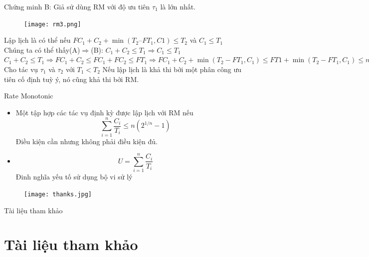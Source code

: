 \documentclass{beamer}
\begin{document}
\begin{frame}{Chứng minh}
B: Giả sử dùng RM với độ ưu tiên $\tau_1$ là lớn nhất.
\begin{figure}[h]
\begin{center}
\texttt{[image: rm3.png]}
\end{center}
\end{figure}
Lập lịch là có thể nếu $FC_1 + C_2 + \min(T_2 – FT_1, C1) \leq T_2$ và $C_1 \leq T_1$ \\
Chúng ta có thể thấy(A)$\Rightarrow$(B): $C_1 + C_2 \leq T_1 \Rightarrow C_1 \leq T_1$ \\
$
C_1 + C_2 \leq T_1 \Rightarrow FC_1 + C_2 \leq FC_1 + FC_2 \leq FT_1 \Rightarrow 
FC_1 + C_2 + \min(T_2 - FT_1, C_1) \leq FT1 + \min(T_2 - FT_1, C_1) \leq min(T_2, C_1 + FT_1) \leq T_2
$ \\
Cho tác vụ $\tau_1$ và $\tau_2$ với $T_1 < T_2$ Nếu lập lịch là khả thi bởi một phân công ưu tiên cố định tuỳ ý, nó cũng khả thi bởi RM.
\end{frame}
\begin{frame}{Rate Monotonic}
\begin{itemize}
\item Một tập hợp các tác vụ định kỳ được lập lịch với RM nếu
\begin{displaymath}
\sum_{i=1}^n \frac{C_i}{T_i} \leq n(2^{1/n} - 1)
\end{displaymath}
Điều kiện cần nhưng không phải điều kiện đủ.
\item 
\begin{displaymath}
U = \sum_{i=1}^n \frac{C_i}{T_i}
\end{displaymath}
Đinh nghĩa yếu tố sử dụng bộ vi sử lý 
\end{itemize}
\end{frame}
\begin{frame}
\begin{figure}[h]
\begin{center}
\texttt{[image: thanks.jpg]}
\end{center}
\end{figure}
\end{frame}
\begin{frame}{Tài liệu tham khảo}
\section*{Tài liệu tham khảo}
\end{frame}
\end{document}
